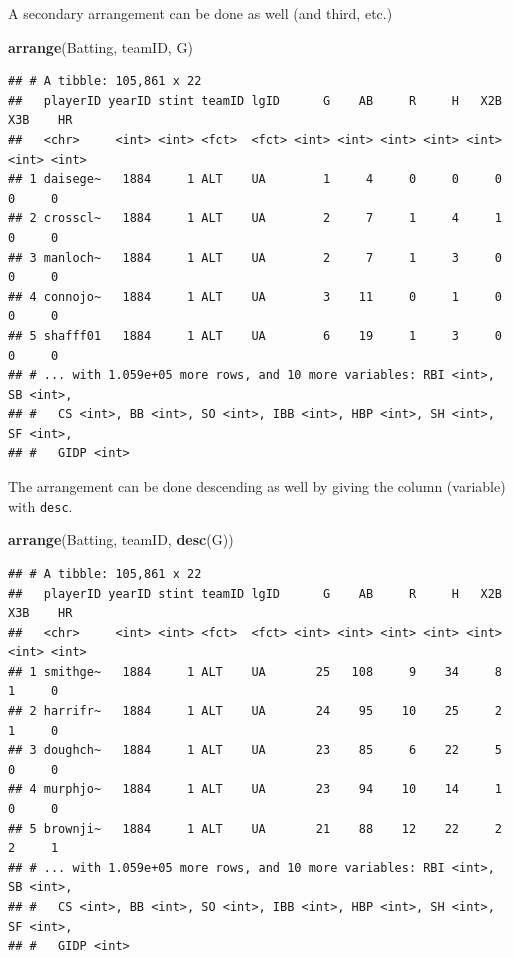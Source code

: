 \documentclass[
]{book}
\newenvironment{Shaded}{\begin{snugshade}}{\end{snugshade}}
\newcommand{\KeywordTok}[1]{\textcolor[rgb]{0.13,0.29,0.53}{\textbf{#1}}}
\newcommand{\NormalTok}[1]{#1}
\theoremstyle{definition}
\theoremstyle{definition}
\theoremstyle{definition}
\theoremstyle{remark}
\begin{document}
A secondary arrangement can be done as well (and third, etc.)

\begin{Shaded}
\begin{Highlighting}[]
\KeywordTok{arrange}\NormalTok{(Batting, teamID, G)}
\end{Highlighting}
\end{Shaded}

\begin{verbatim}
## # A tibble: 105,861 x 22
##   playerID yearID stint teamID lgID      G    AB     R     H   X2B   X3B    HR
##   <chr>     <int> <int> <fct>  <fct> <int> <int> <int> <int> <int> <int> <int>
## 1 daisege~   1884     1 ALT    UA        1     4     0     0     0     0     0
## 2 crosscl~   1884     1 ALT    UA        2     7     1     4     1     0     0
## 3 manloch~   1884     1 ALT    UA        2     7     1     3     0     0     0
## 4 connojo~   1884     1 ALT    UA        3    11     0     1     0     0     0
## 5 shafff01   1884     1 ALT    UA        6    19     1     3     0     0     0
## # ... with 1.059e+05 more rows, and 10 more variables: RBI <int>, SB <int>,
## #   CS <int>, BB <int>, SO <int>, IBB <int>, HBP <int>, SH <int>, SF <int>,
## #   GIDP <int>
\end{verbatim}

The arrangement can be done descending as well by giving the column (variable) with \texttt{desc}.

\begin{Shaded}
\begin{Highlighting}[]
\KeywordTok{arrange}\NormalTok{(Batting, teamID, }\KeywordTok{desc}\NormalTok{(G))}
\end{Highlighting}
\end{Shaded}

\begin{verbatim}
## # A tibble: 105,861 x 22
##   playerID yearID stint teamID lgID      G    AB     R     H   X2B   X3B    HR
##   <chr>     <int> <int> <fct>  <fct> <int> <int> <int> <int> <int> <int> <int>
## 1 smithge~   1884     1 ALT    UA       25   108     9    34     8     1     0
## 2 harrifr~   1884     1 ALT    UA       24    95    10    25     2     1     0
## 3 doughch~   1884     1 ALT    UA       23    85     6    22     5     0     0
## 4 murphjo~   1884     1 ALT    UA       23    94    10    14     1     0     0
## 5 brownji~   1884     1 ALT    UA       21    88    12    22     2     2     1
## # ... with 1.059e+05 more rows, and 10 more variables: RBI <int>, SB <int>,
## #   CS <int>, BB <int>, SO <int>, IBB <int>, HBP <int>, SH <int>, SF <int>,
## #   GIDP <int>
\end{verbatim}
\end{document}
